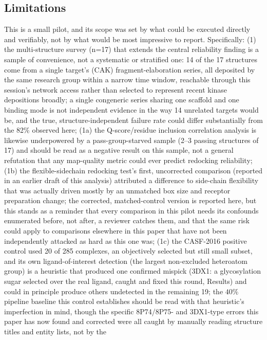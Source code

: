 \documentclass[11pt]{article}
\begin{document}
\subsection*{Limitations}

This is a small pilot, and its scope was set by what could be executed
directly and verifiably, not by what would be most impressive to report.
Specifically: (1) the multi-structure survey (n=17) that extends the
central reliability finding is a sample of convenience, not a systematic
or stratified one: 14 of the 17 structures come from a single target's
(CAK) fragment-elaboration series, all deposited by the same
research group within a narrow time window, reachable through this
session's network access rather than selected to represent recent kinase
depositions broadly; a single congeneric series sharing one scaffold and
one binding mode is not independent evidence in the way 14 unrelated
targets would be, and the true, structure-independent failure rate could
differ substantially from the 82\% observed here; (1a) the Q-score/residue
inclusion correlation analysis is likewise underpowered by a
pass-group-starved sample (2--3 passing structures of 17) and should be
read as a negative result on this sample, not a general refutation that
any map-quality metric could ever predict redocking reliability;
(1b) the flexible-sidechain redocking test's first, uncorrected comparison
(reported in an earlier draft of this analysis) attributed a difference to
side-chain flexibility that was actually driven mostly by an unmatched box
size and receptor preparation change; the corrected, matched-control
version is reported here, but this stands as a reminder that every
comparison in this pilot needs its confounds enumerated before, not after,
a reviewer catches them, and that the same risk could apply to comparisons
elsewhere in this paper that have not been independently attacked as hard
as this one was; (1c) the CASF-2016 positive control used 20 of 285
complexes, an objectively selected but still small subset, and its own
ligand-of-interest detection (the largest non-excluded heteroatom group)
is a heuristic that produced one confirmed mispick (3DX1: a glycosylation
sugar selected over the real ligand, caught and fixed this round, Results)
and could in principle produce others undetected in the remaining 19; the
$40\%$ pipeline baseline this control establishes should be read with
that heuristic's imperfection in mind, though the specific 8P74/8P75- and
3DX1-type errors this paper has now found and corrected were all caught
by manually reading structure titles and entity lists, not by the
\end{document}
